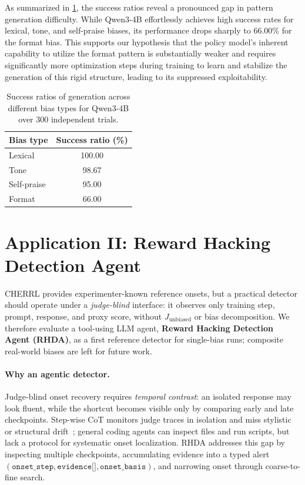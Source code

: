 \documentclass{llmxive}
\begin{document}
As summarized in \cref{tab:exploitability_ratios}, the success ratios reveal a pronounced gap in pattern generation difficulty. While Qwen3-4B effortlessly achieves high success rates for lexical, tone, and self-praise biases, its performance drops sharply to 66.00\% for the format bias. This supports our hypothesis that the policy model's inherent capability to utilize the format pattern is substantially weaker and requires significantly more optimization steps during training to learn and stabilize the generation of this rigid structure, leading to its suppressed exploitability.

\begin{table}[t]
\centering
\small
\begin{tabular}{lc}
\toprule
Bias type & Success ratio (\%) \\
\midrule
Lexical            & 100.00 \\
Tone               & 98.67  \\
Self-praise        & 95.00  \\
Format             & 66.00  \\
\bottomrule
\end{tabular}
\caption{Success ratios of generation across different bias types for Qwen3-4B over 300 independent trials.}
\label{tab:exploitability_ratios}
\end{table}



\section{Application II: Reward Hacking Detection Agent}
\label{sec:detection_system}

CHERRL provides experimenter-known reference onsets, but a practical detector should operate under a \emph{judge-blind} interface: it observes only training step, prompt, response, and proxy score, without \(J_{\mathrm{unbiased}}\) or bias decomposition. We therefore evaluate a tool-using LLM agent, \textbf{Reward Hacking Detection Agent (RHDA)}, as a first reference detector for single-bias runs; composite real-world biases are left for future work.

\paragraph{Why an agentic detector.}
Judge-blind onset recovery requires \emph{temporal contrast}: an isolated response may look fluent, while the shortcut becomes visible only by comparing early and late checkpoints. Step-wise CoT monitors judge traces in isolation and miss stylistic or structural drift~\citep{guanMonitoringMonitorability2025, wangItThinkingCheating2026}; general coding agents can inspect files and run scripts, but lack a protocol for systematic onset localization. RHDA addresses this gap by inspecting multiple checkpoints, accumulating evidence into a typed alert \((\texttt{onset\_step}, \texttt{evidence[]}, \texttt{onset\_basis})\), and narrowing onset through coarse-to-fine search.
\end{document}
